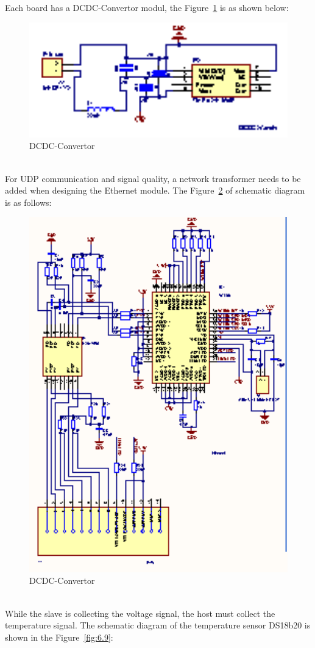 Each board has a DCDC-Convertor modul, the Figure~\ref{fig:6.7} is as shown below:
\begin{figure}[!ht]
	\centering
	\includegraphics[width=16cm]{grafiken/dcdc.eps}
	\caption{DCDC-Convertor} 
	\label{fig:6.7}
\end{figure}
\FloatBarrier
\\

For UDP communication and signal quality, a network transformer needs to be added when designing the Ethernet module. The Figure~\ref{fig:6.8} of schematic diagram is as follows:
 
\begin{figure}[!ht]
	\centering
	\includegraphics[width=16cm]{grafiken/w5500.eps}
	\caption{DCDC-Convertor} 
	\label{fig:6.8}
\end{figure}
\FloatBarrier
\\
While the slave is collecting the voltage signal, the host must collect the temperature signal. The schematic diagram of the temperature sensor DS18b20 is shown in the Figure~\ref{fig:6.9}:

